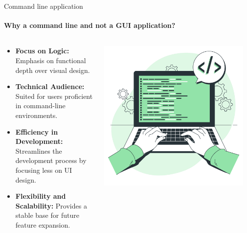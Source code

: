 \documentclass[
    ngerman,%
    authorontitle=true,
]{bfhbeamer}
\begin{document}
    
    \begin{frame}{Command line application}
    	\framesubtitle{Why a command line and not a GUI application?}
    	\begin{columns} %
    		\begin{column}{0.7\textwidth} %
    			\begin{itemize}
    				\item \textbf{Focus on Logic:} Emphasis on functional depth over visual design.
    				\item \textbf{Technical Audience:} Suited for users proficient in command-line environments.
    				\item \textbf{Efficiency in Development:} Streamlines the development process by focusing less on UI design.
    				\item \textbf{Flexibility and Scalability:} Provides a stable base for future feature expansion.
    			\end{itemize}
    		\end{column}
    		\begin{column}{0.3\textwidth} %
	    		\begin{center}
	    			\includegraphics[width=0.95\textwidth]{pictures/final_presentation/cmd_2.jpg}
	    		\end{center}
    		\end{column}
    	\end{columns}
    	

\end{frame}
\end{document}
